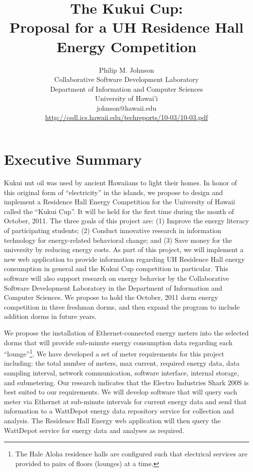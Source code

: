 \documentclass[11pt]{article}
\begin{document}
\title{The Kukui Cup: \\Proposal for a UH Residence Hall Energy Competition}

\author{Philip M. Johnson \\
Collaborative Software Development Laboratory \\
Department of Information and Computer Sciences \\
University of Hawai'i \\
johnson@hawaii.edu \\
\url{http://csdl.ics.hawaii.edu/techreports/10-03/10-03.pdf}
}

\maketitle

\tableofcontents
\newpage

\section{Executive Summary}

Kukui nut oil was used by ancient Hawaiians to light their homes.  In honor
of this original form of ``electricity'' in the islands, we propose to design and
implement a Residence Hall Energy Competition for the University of Hawaii called the
``Kukui Cup''.   It will be held for the first time during the month of October,
2011.  The three goals of this project are: (1) Improve the energy literacy
of participating students; (2) Conduct innovative research in information
technology for energy-related behavioral change; and (3) Save money for the
university by reducing energy costs.  As part of this project, we will
implement a new web application to provide information regarding UH Residence Hall
energy consumption in general and the Kukui Cup competition in particular.  This
software will also support research on energy behavior by the Collaborative
Software Development Laboratory in the Department of Information and
Computer Sciences.  We propose to hold the October, 2011 dorm energy
competition in three freshman dorms, and then expand the program to include
addition dorms in future years.

We propose the installation of Ethernet-connected energy meters into the
selected dorms that will provide sub-minute energy consumption data
regarding each ``lounge''\footnote{The Hale Aloha residence halls are
  configured such that electrical services are provided to pairs of floors
  (lounges) at a time.}.  We have developed a set of meter requirements for
this project including: the total number of meters, max current, required
energy data, data sampling interval, network communication, software
interface, internal storage, and submetering.  Our research indicates that
the Electro Industries Shark 200S is best suited to our requirements. 
We will develop software that will query each
meter via Ethernet at sub-minute intervals for current energy data and send
that information to a WattDepot energy data repository service for
collection and analysis.  The Residence Hall Energy web application will
then query the WattDepot service for energy data and analyses as required.
\end{document}
